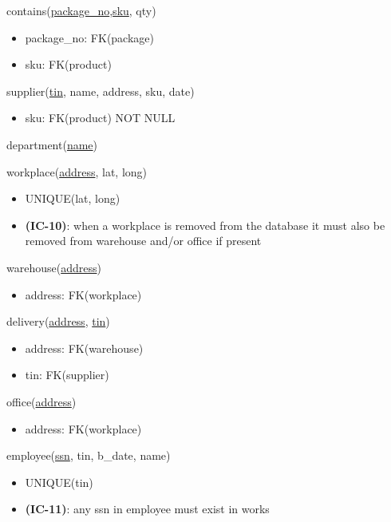 \documentclass[12pt,a4paper]{article}
\begin{document}
  \vspace*{10pt}
  \noindent
  contains(\underline{package\_no},\underline{sku}, qty)
  \begin{itemize}[nosep]
      \item package\_no: FK(package)
      \item sku: FK(product)
  \end{itemize}

  \vspace*{10pt}
  \noindent
  supplier(\underline{tin}, name, address, sku, date)
  \begin{itemize}[nosep]
      \item sku: FK(product) NOT NULL
  \end{itemize}

  \vspace*{10pt}
  \noindent
  department(\underline{name})

  \vspace*{10pt}
  \noindent
  workplace(\underline{address}, lat, long)
  \begin{itemize}[nosep]
      \item UNIQUE(lat, long)
      \item \textsf{\textbf{(IC-10)}}: when a workplace \textsf{is removed} from the database it \textsf{must also} be removed from warehouse \textsf{and/or} office if present
  \end{itemize}

  \vspace*{10pt}
  \noindent
  warehouse(\underline{address})
  \begin{itemize}[nosep]
      \item address: FK(workplace)
  \end{itemize}

  \vspace*{10pt}
  \noindent
  delivery(\underline{address}, \underline{tin})
  \begin{itemize}[nosep]
      \item address: FK(warehouse)
      \item tin: FK(supplier)
  \end{itemize}

  \vspace*{10pt}
  \noindent
  office(\underline{address})
  \begin{itemize}[nosep]
      \item address: FK(workplace)
  \end{itemize}

  \vspace*{10pt}
  \noindent
  employee(\underline{ssn}, tin, b\_date, name)
  \begin{itemize}[nosep]
      \item UNIQUE(tin)
      \item \textsf{\textbf{(IC-11)}}: any ssn in employee \textsf{must exist} in works
  \end{itemize}
\end{document}
